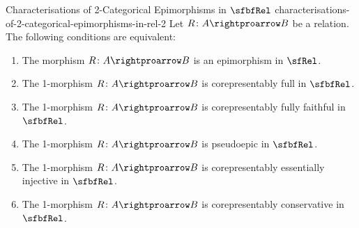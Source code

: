 \begin{proposition}{Characterisations of 2-Categorical Epimorphisms in $\sfbfRel$ \rmII}{characterisations-of-2-categorical-epimorphisms-in-rel-2}%
    Let $R\colon A\rightproarrow B$ be a relation. The following conditions are equivalent:
    \begin{enumerate}
        \item\label{characterisations-of-2-categorical-epimorphisms-in-rel-2-1}The morphism $R\colon A\rightproarrow B$ is an epimorphism in $\sfRel$.
        \item\label{characterisations-of-2-categorical-epimorphisms-in-rel-2-2}The 1-morphism $R\colon A\rightproarrow B$ is corepresentably full in $\sfbfRel$.
        \item\label{characterisations-of-2-categorical-epimorphisms-in-rel-2-3}The 1-morphism $R\colon A\rightproarrow B$ is corepresentably fully faithful in $\sfbfRel$.
        \item\label{characterisations-of-2-categorical-epimorphisms-in-rel-2-4}The 1-morphism $R\colon A\rightproarrow B$ is pseudoepic in $\sfbfRel$.
        \item\label{characterisations-of-2-categorical-epimorphisms-in-rel-2-5}The 1-morphism $R\colon A\rightproarrow B$ is corepresentably essentially injective in $\sfbfRel$.
        \item\label{characterisations-of-2-categorical-epimorphisms-in-rel-2-6}The 1-morphism $R\colon A\rightproarrow B$ is corepresentably conservative in $\sfbfRel$.
    \end{enumerate}
\end{proposition}
